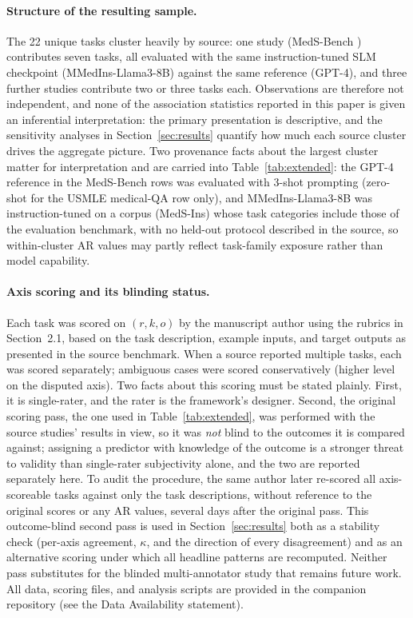 \documentclass[11pt]{article}
\begin{document}
\paragraph{Structure of the resulting sample.}
The 22 unique tasks cluster heavily by source: one study (MedS-Bench \cite{Wu2025MedS}) contributes seven tasks, all evaluated with the same instruction-tuned SLM checkpoint (MMedIns-Llama3-8B) against the same reference (GPT-4), and three further studies contribute two or three tasks each. Observations are therefore not independent, and none of the association statistics reported in this paper is given an inferential interpretation: the primary presentation is descriptive, and the sensitivity analyses in Section~\ref{sec:results} quantify how much each source cluster drives the aggregate picture. Two provenance facts about the largest cluster matter for interpretation and are carried into Table~\ref{tab:extended}: the GPT-4 reference in the MedS-Bench rows was evaluated with 3-shot prompting (zero-shot for the USMLE medical-QA row only), and MMedIns-Llama3-8B was instruction-tuned on a corpus (MedS-Ins) whose task categories include those of the evaluation benchmark, with no held-out protocol described in the source, so within-cluster AR values may partly reflect task-family exposure rather than model capability.

\paragraph{Axis scoring and its blinding status.}
Each task was scored on $(r, k, o)$ by the manuscript author using the rubrics in Section~2.1, based on the task description, example inputs, and target outputs as presented in the source benchmark. When a source reported multiple tasks, each was scored separately; ambiguous cases were scored conservatively (higher level on the disputed axis). Two facts about this scoring must be stated plainly. First, it is single-rater, and the rater is the framework's designer. Second, the original scoring pass, the one used in Table~\ref{tab:extended}, was performed with the source studies' results in view, so it was \emph{not} blind to the outcomes it is compared against; assigning a predictor with knowledge of the outcome is a stronger threat to validity than single-rater subjectivity alone, and the two are reported separately here. To audit the procedure, the same author later re-scored all axis-scoreable tasks against only the task descriptions, without reference to the original scores or any AR values, several days after the original pass. This outcome-blind second pass is used in Section~\ref{sec:results} both as a stability check (per-axis agreement, $\kappa$, and the direction of every disagreement) and as an alternative scoring under which all headline patterns are recomputed. Neither pass substitutes for the blinded multi-annotator study that remains future work. All data, scoring files, and analysis scripts are provided in the companion repository (see the Data Availability statement).
\end{document}
